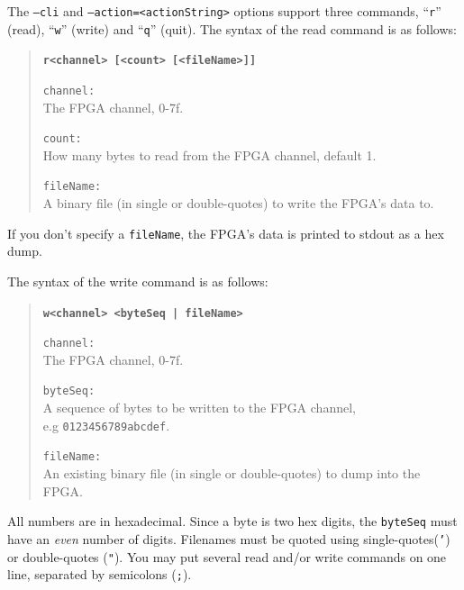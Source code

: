 The \texttt{--cli} and \texttt{--action=<actionString>} options support three commands, ``\texttt{r}'' (read), ``\texttt{w}'' (write) and ``\texttt{q}'' (quit). The syntax of the read command is as follows:

\begin{quote}
\textbf{\texttt{r<channel> [<count> [<fileName>]]}}

\begin{desc}
  \item[\texttt{channel:}] \hfill \\
    The FPGA channel, 0-7f.
  \item[\texttt{count:}] \hfill \\
    How many bytes to read from the FPGA channel, default 1.
  \item[\texttt{fileName:}] \hfill \\
    A binary file (in single or double-quotes) to write the FPGA's data to.
\end{desc}
\end{quote}

If you don't specify a \texttt{fileName}, the FPGA's data is printed to stdout as a hex dump.

\newpage
The syntax of the write command is as follows:

\begin{quote}
\textbf{\texttt{w<channel> <byteSeq | fileName>}}

\begin{desc}
  \item[\texttt{channel:}] \hfill \\
    The FPGA channel, 0-7f.
  \item[\texttt{byteSeq:}] \hfill \\
    A sequence of bytes to be written to the FPGA channel,\\e.g \texttt{0123456789abcdef}.
  \item[\texttt{fileName:}] \hfill \\
    An existing binary file (in single or double-quotes) to dump into the FPGA.
\end{desc}
\end{quote}

All numbers are in hexadecimal. Since a byte is two hex digits, the \texttt{byteSeq} must have an \textit{even} number of digits. Filenames must be quoted using single-quotes(\texttt{'}) or double-quotes (\texttt{"}). You may put several read and/or write commands on one line, separated by semicolons (\texttt{;}).


